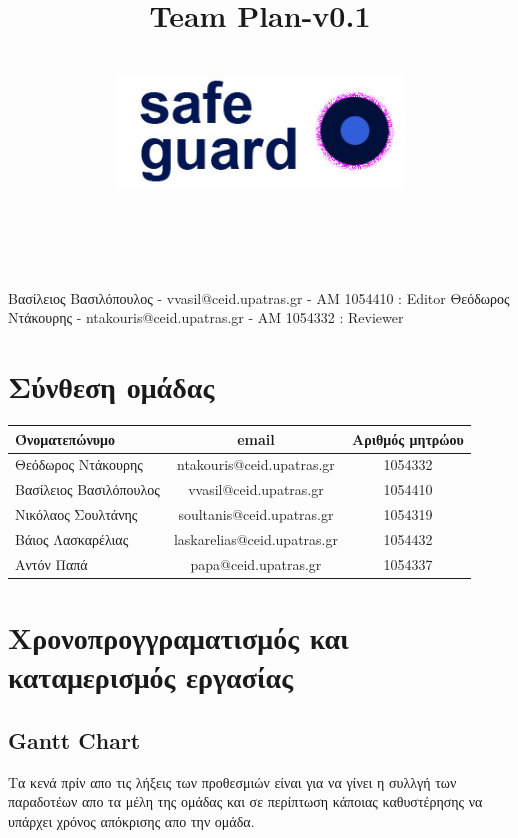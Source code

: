 \documentclass{article}
\title{Team Plan-v0.1}
\author{\\
\includegraphics[width=3in]{safeguard}\\[1ex]\\\\
}
\begin{document}
\maketitle

\newpage

Βασίλειος Βασιλόπουλος - vvasil@ceid.upatras.gr - ΑΜ 1054410 : Editor
Θεόδωρος Ντάκουρης - ntakouris@ceid.upatras.gr - ΑΜ 1054332 : Reviewer

\renewcommand{\contentsname}{Περιεχόμενα}
\tableofcontents


\section{Σύνθεση ομάδας}
\begin{tabular}{|l|c|c|}
\hline
Όνοματεπώνυμο & email & Αριθμός μητρώου  \\
\hline
Θεόδωρος Ντάκουρης & ntakouris@ceid.upatras.gr & 1054332 \\
Βασίλειος Βασιλόπουλος & vvasil@ceid.upatras.gr &  1054410\\
Νικόλαος Σουλτάνης & soultanis@ceid.upatras.gr & 1054319  \\
Βάιος Λασκαρέλιας & laskarelias@ceid.upatras.gr & 1054432 \\
Αντόν Παπά & papa@ceid.upatras.gr & 1054337 \\
\hline
\end{tabular}

\section{Χρονοπρογγραματισμός και καταμερισμός εργασίας}
\subsection{Gantt Chart}
Τα κενά πρίν απο τις λήξεις των προθεσμιών είναι για να γίνει η συλλγή των παραδοτέων απο τα μέλη της ομάδας και σε περίπτωση κάποιας καθυστέρησης να υπάρχει χρόνος απόκρισης απο την ομάδα.
\begin{center}
\end{center}
\end{document}
